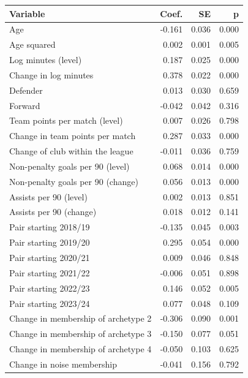 \begin{tabular}{lrrr}
\toprule
Variable & Coef. & SE & p \\
\midrule
Age & -0.161 & 0.036 & 0.000 \\
Age squared & 0.002 & 0.001 & 0.005 \\
Log minutes (level) & 0.187 & 0.025 & 0.000 \\
Change in log minutes & 0.378 & 0.022 & 0.000 \\
Defender & 0.013 & 0.030 & 0.659 \\
Forward & -0.042 & 0.042 & 0.316 \\
Team points per match (level) & 0.007 & 0.026 & 0.798 \\
Change in team points per match & 0.287 & 0.033 & 0.000 \\
Change of club within the league & -0.011 & 0.036 & 0.759 \\
Non-penalty goals per 90 (level) & 0.068 & 0.014 & 0.000 \\
Non-penalty goals per 90 (change) & 0.056 & 0.013 & 0.000 \\
Assists per 90 (level) & 0.002 & 0.013 & 0.851 \\
Assists per 90 (change) & 0.018 & 0.012 & 0.141 \\
Pair starting 2018/19 & -0.135 & 0.045 & 0.003 \\
Pair starting 2019/20 & 0.295 & 0.054 & 0.000 \\
Pair starting 2020/21 & 0.009 & 0.046 & 0.848 \\
Pair starting 2021/22 & -0.006 & 0.051 & 0.898 \\
Pair starting 2022/23 & 0.146 & 0.052 & 0.005 \\
Pair starting 2023/24 & 0.077 & 0.048 & 0.109 \\
Change in membership of archetype 2 & -0.306 & 0.090 & 0.001 \\
Change in membership of archetype 3 & -0.150 & 0.077 & 0.051 \\
Change in membership of archetype 4 & -0.050 & 0.103 & 0.625 \\
Change in noise membership & -0.041 & 0.156 & 0.792 \\
\bottomrule
\end{tabular}
